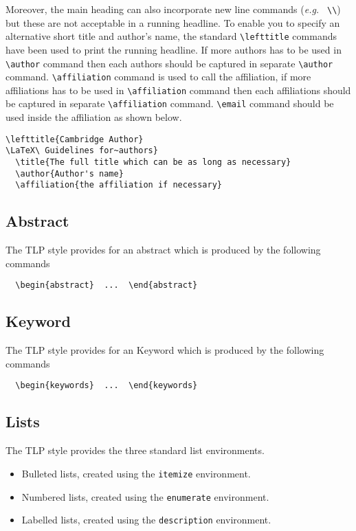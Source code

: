 \documentclass{tlp}
\begin{document}
Moreover, the main heading can also incorporate new line commands
({\it e.g.\ } \verb"\\") but these are not acceptable in a running headline.
To enable you to specify an alternative short title and author's name, the
standard \verb"\lefttitle" commands have been used to print the running headline. If more authors has to be used in \verb"\author" command then each authors should be captured in separate \verb"\author" command.
\verb"\affiliation" command is used to call the affiliation, if more affiliations has to be used in \verb"\affiliation" command then each affiliations should be captured in separate \verb"\affiliation" command.
\verb"\email" command should be used inside the affiliation as shown below.
%
\begin{verbatim}
\lefttitle{Cambridge Author}
\LaTeX\ Guidelines for~authors}
  \title{The full title which can be as long as necessary}
  \author{Author's name}
  \affiliation{the affiliation if necessary}
\end{verbatim}
%

\subsection{Abstract}

The TLP style provides for an abstract which is produced by the following
commands
%
\begin{verbatim}
  \begin{abstract}  ...  \end{abstract}
\end{verbatim}

\subsection{Keyword}

The TLP style provides for an Keyword which is produced by the following
commands
%
\begin{verbatim}
  \begin{keywords}  ...  \end{keywords}
\end{verbatim}


\subsection{Lists}

The TLP style provides the three standard list environments.
\begin{itemize}
  \item Bulleted lists, created using the \verb"itemize" environment.
  \item Numbered lists, created using the \verb"enumerate" environment.
  \item Labelled lists, created using the \verb"description" environment.
\end{itemize}
\end{document}
